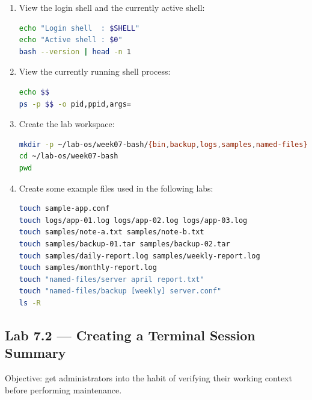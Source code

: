 \begin{enumerate}
  \item View the login shell and the currently active shell:
\begin{lstlisting}[language=bash, caption={Checking the login shell and active shell}]
echo "Login shell  : $SHELL"
echo "Active shell : $0"
bash --version | head -n 1
\end{lstlisting}

  \item View the currently running shell process:
\begin{lstlisting}[language=bash, caption={Viewing the active shell process}]
echo $$
ps -p $$ -o pid,ppid,args=
\end{lstlisting}

  \item Create the lab workspace:
\begin{lstlisting}[language=bash, caption={Creating the Bash lab workspace}]
mkdir -p ~/lab-os/week07-bash/{bin,backup,logs,samples,named-files}
cd ~/lab-os/week07-bash
pwd
\end{lstlisting}

  \item Create some example files used in the following labs:
\begin{lstlisting}[language=bash, caption={Creating example files for subsequent labs}]
touch sample-app.conf
touch logs/app-01.log logs/app-02.log logs/app-03.log
touch samples/note-a.txt samples/note-b.txt
touch samples/backup-01.tar samples/backup-02.tar
touch samples/daily-report.log samples/weekly-report.log
touch samples/monthly-report.log
touch "named-files/server april report.txt"
touch "named-files/backup [weekly] server.conf"
ls -R
\end{lstlisting}
\end{enumerate}

\subsection*{Lab 7.2 --- Creating a Terminal Session Summary}

Objective: get administrators into the habit of verifying their working
context before performing maintenance.

